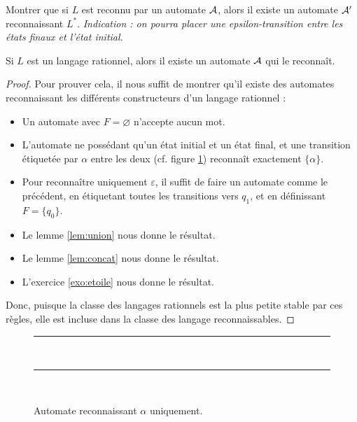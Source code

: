  \begin{exo}\label{exo:etoile}
     Montrer que si $L$ est reconnu par un automate $\mathcal A$, alors il existe un automate $\mathcal A'$ reconnaissant $L^*$. \textit{Indication : on pourra placer une epsilon-transition entre les états finaux et l'état initial.}
 \end{exo}

 \begin{prop}\label{prop:kleene1}
     Si $L$ est un langage rationnel, alors il existe un automate $\mathcal A$ qui le reconnaît.
 \end{prop}

 \begin{proof}
     Pour prouver cela, il nous suffit de montrer qu'il existe des automates reconnaissant les différents constructeurs d'un langage rationnel :
     \begin{itemize}[label=$\bullet$]
         \item Un automate avec $F=\varnothing$ n'accepte aucun mot.
         \item L'automate ne possédant qu'un état initial et un état final, et une transition étiquetée par $\alpha$ entre les deux (cf. figure \ref{fig:automate2}) reconnaît exactement $\{\alpha\}$.
         \item Pour reconnaître uniquement $\varepsilon$, il suffit de faire un automate comme le précédent, en étiquetant toutes les transitions vers $q_1$, et en définissant $F=\{q_0\}$.
         \item Le lemme \ref{lem:union} nous donne le résultat.
         \item Le lemme \ref{lem:concat} nous donne le résultat.
         \item L'exercice \ref{exo:etoile} nous donne le résultat.
     \end{itemize}
     Donc, puisque la classe des langages rationnels est la plus petite stable par ces règles, elle est incluse dans la classe des langage reconnaissables.
 \end{proof}

 \begin{figure}[h]
     \centering
     \rule{17cm}{0.5pt}\\
     \vspace{0.5cm}
     \rule{17cm}{0.5pt}\\
     \vspace{0.5cm}
     \caption{Automate reconnaissant $\alpha$ uniquement.}
     \label{fig:automate2}
 \end{figure}

